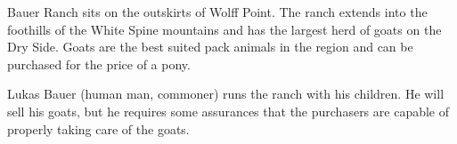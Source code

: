 Bauer Ranch sits on the outskirts of Wolff Point.
The ranch extends into the foothills of the White Spine mountains and has the largest herd of goats on the Dry Side.
Goats are the best suited pack animals in the region and can be purchased for the price of a pony.

Lukas Bauer (human man, commoner) runs the ranch with his children.
He will sell his goats, but he requires some assurances that the purchasers are capable of properly taking care of the goats.
